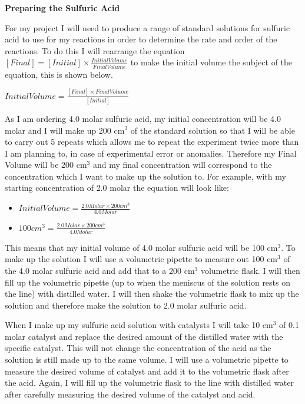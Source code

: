 \textbf{Preparing the Sulfuric Acid}

For my project I will need to produce a range of standard solutions for sulfuric acid to use for my reactions in order to determine the rate and order of the reactions. To do this I will rearrange the equation $[Final] = [Initial] \times \frac{Initial Volume}{Final Volume}$ to make the initial volume the subject of the equation, this is shown below.

$Initial Volume = \frac{[Final] \times Final Volume}{[Initial]}$

As I am ordering 4.0 molar sulfuric acid, my initial concentration will be 4.0 molar and I will make up 200 cm$^3$ of the standard solution so that I will be able to carry out 5 repeats which allows me to repeat the experiment twice more than I am planning to, in case of experimental error or anomalies. Therefore my Final Volume will be 200 cm$^3$ and my final concentration will correspond to the concentration which I want to make up the solution to. For example, with my starting concentration of 2.0 molar the equation will look like:

\begin{itemize}
\item $Initial Volume = \frac{2.0 Molar \times 200 cm^3}{4.0 Molar}$
\item $100 cm^3 = \frac{2.0 Molar \times 200 cm^3}{4.0 Molar}$
\end{itemize}

This means that my initial volume of 4.0 molar sulfuric acid will be 100 cm$^3$. To make up the solution I will use a volumetric pipette to measure out 100 cm$^3$ of the 4.0 molar sulfuric acid and add that to a 200 cm$^3$ volumetric flask. I will then fill up the volumetric pipette (up to when the meniscus of the solution rests on the line) with distilled water. I will then shake the volumetric flask to mix up the solution and therefore make the solution to 2.0 molar sulfuric acid. 

When I make up my sulfuric acid solution with catalysts I will take 10 cm$^3$ of 0.1 molar catalyst and replace the desired amount of the distilled water with the specific catalyst. This will not change the concentration of the acid as the solution is still made up to the same volume. I will use a volumetric pipette to measure the desired volume of catalyst and add it to the volumetric flask after the acid. Again, I will fill up the volumetric flask to the line with distilled water after carefully measuring the desired volume of the catalyst and acid.


